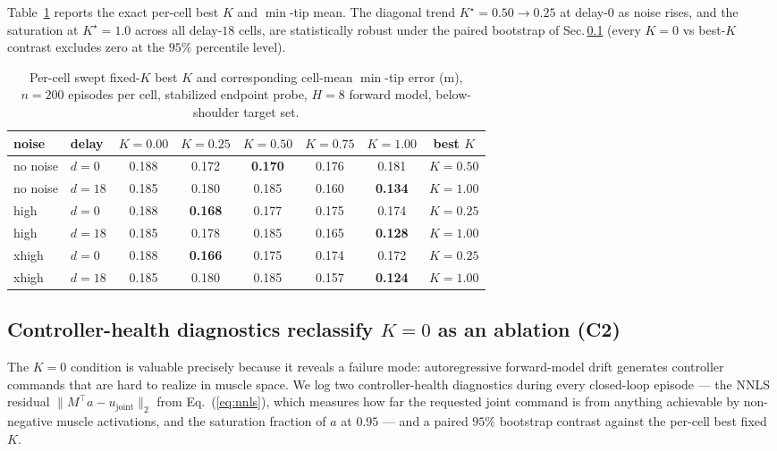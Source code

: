 \documentclass[sn-mathphys,NameDate,iicol]{sn-jnl}
\begin{document}
Table~\ref{tab:r3_bestK} reports the exact per-cell best $K$ and
$\min$-tip mean. The diagonal trend $K^{\star}\!=\!0.50\!\to\!0.25$
at delay-$0$ as noise rises, and the saturation at $K^{\star}\!=\!1.0$
across all delay-$18$ cells, are statistically robust under the
paired bootstrap of Sec.\,\ref{sec:results-c2} (every $K{=}0$ vs
best-$K$ contrast excludes zero at the $95\%$ percentile level).

\begin{table}[!htbp]
\centering
\caption{Per-cell swept fixed-$K$ best $K$ and corresponding
cell-mean $\min$-tip error (m), $n{=}200$ episodes per cell,
stabilized endpoint probe, $H{=}8$ forward model, below-shoulder
target set.}
\setlength{\tabcolsep}{4pt}
\footnotesize
\begin{tabular}{@{}ll cccc cc@{}}
\toprule
noise & delay & $K{=}0.00$ & $K{=}0.25$ & $K{=}0.50$ & $K{=}0.75$ & $K{=}1.00$ & best $K$ \\
\midrule
no noise & $d{=}0$ & 0.188 & 0.172 & \textbf{0.170} & 0.176 & 0.181 & $K{=}0.50$ \\
no noise & $d{=}18$ & 0.185 & 0.180 & 0.185 & 0.160 & \textbf{0.134} & $K{=}1.00$ \\
high & $d{=}0$ & 0.188 & \textbf{0.168} & 0.177 & 0.175 & 0.174 & $K{=}0.25$ \\
high & $d{=}18$ & 0.185 & 0.178 & 0.185 & 0.165 & \textbf{0.128} & $K{=}1.00$ \\
xhigh & $d{=}0$ & 0.188 & \textbf{0.166} & 0.175 & 0.174 & 0.172 & $K{=}0.25$ \\
xhigh & $d{=}18$ & 0.185 & 0.180 & 0.185 & 0.157 & \textbf{0.124} & $K{=}1.00$ \\
\bottomrule
\end{tabular}
\label{tab:r3_bestK}
\end{table}

\subsection{Controller-health diagnostics reclassify $K{=}0$ as an ablation (C2)}
\label{sec:results-c2}

The $K\!=\!0$ condition is valuable precisely because it reveals a
failure mode: autoregressive forward-model drift generates controller
commands that are hard to realize in muscle space. We log two
controller-health diagnostics during every closed-loop episode --- the
NNLS residual $\lVert M^{\top}a - u_{\mathrm{joint}}\rVert_{2}$ from
Eq.~(\ref{eq:nnls}), which measures how far the requested joint command
is from anything achievable by non-negative muscle activations, and
the saturation fraction of $a$ at $0.95$ --- and a paired
$95\%$ bootstrap contrast against the per-cell best fixed $K$.
\end{document}
